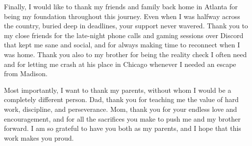 Finally, I would like to thank my friends and family back home in Atlanta for being my foundation throughout this journey. Even when I was halfway across the country, buried deep in deadlines, your support never wavered. Thank you to my close friends for the late-night phone calls and gaming sessions over Discord that kept me sane and social, and for always making time to reconnect when I was home. Thank you also to my brother for being the reality check I often need and for letting me crash at his place in Chicago whenever I needed an escape from Madison.

Most importantly, I want to thank my parents, without whom I would be a completely different person. Dad, thank you for teaching me the value of hard work, discipline, and perseverance. Mom, thank you for your endless love and encouragement, and for all the sacrifices you make to push me and my brother forward. I am so grateful to have you both as my parents, and I hope that this work makes you proud.